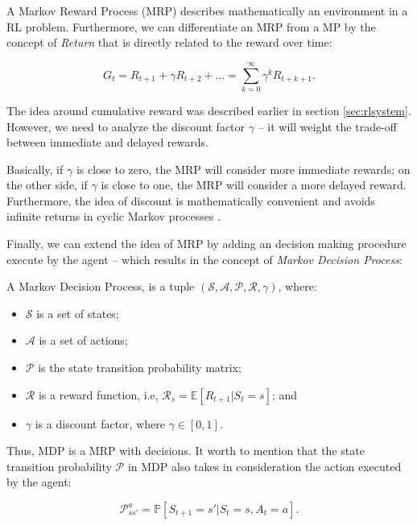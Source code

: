 A Markov Reward Process (MRP) describes mathematically an environment in a RL problem. Furthermore, we can differentiate an MRP from a MP by the concept of \textit{Return} that is directly related to the reward over time:

\begin{equation}
G_{t} = R_{t+1} + \gamma R_{t + 2} + \dots = \sum_{k = 0}^{\infty} \gamma^{k} R_{t + k + 1}.
\end{equation}

The idea around cumulative reward was described earlier in section \ref{sec:rlsystem}. However, we need to analyze the discount factor $\gamma$ -- it will weight the trade-off between immediate and delayed rewards. 

Basically, if $\gamma$ is close to zero, the MRP will consider more immediate rewards; on the other side, if $\gamma$ is close to one, the MRP will consider a more delayed reward. Furthermore, the idea of discount is mathematically convenient and avoids infinite returns in cyclic Markov processes \cite{davidsilverlec2}.

Finally, we can extend the idea of MRP by adding an decision making procedure execute by the agent -- which results in the concept of \textit{Markov Decision Process}:

\begin{definition}
		A Markov Decision Process, is a tuple $(\mathcal{S}, \mathcal{A}, \mathcal{P}, \mathcal{R}, \gamma)$, where:
	\begin{itemize}
		\item $\mathcal{S}$ is a set of states; 
		\item $\mathcal{A}$ is a set of actions; 
		\item $\mathcal{P}$ is the state transition probability matrix;
		\item $\mathcal{R}$ is a reward function, i.e, $\mathcal{R}_{s} = \mathbb{E}[R_{t+1} | S_{t} = s]$; and
		\item $\gamma$ is a discount factor, where $\gamma \in [0,1]$.
	\end{itemize}
\end{definition}

Thus, MDP is a MRP with decisions. It worth to mention that the state transition probability $\mathcal{P}$ in MDP also takes in consideration the action executed by the agent:

\begin{equation}
\mathcal{P}_{ss'}^{a} = \mathbb{P}[S_{t+1} = s' | S_{t} = s, A_{t} = a].
\end{equation}


